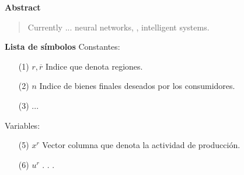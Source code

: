 \newpage
\begin{center}
 {\bf\LARGE Abstract}\vskip 1.5cm
\end{center} 
\begin{quotation}
Currently ...
\vskip 0.3cm
\hspace*{-0.6cm}{\bf Keywords:} neural networks, , intelligent systems.
\end{quotation}


\newpage
{}
 {\bf\LARGE Lista de símbolos}
 \vskip 1.5cm
Constantes: 
\begin{enumerate}
\item[(1)]$r,\overline{r} $ \hspace*{0.8cm} Indice que denota regiones.
\item[(2)] $n $ \hspace*{1.1cm} Indice de bienes finales deseados por los consumidores.
\item[(3)] ...
\vskip 3cm
\end{enumerate} 
\vskip 0.3cm
Variables:
\begin{enumerate}
\item[(5)] $ x^{r} $ \hspace*{1cm} Vector columna que denota la actividad de producción.
\item[(6)] $ u^{r} $ \hspace*{1.2cm} . . .
\end{enumerate}

